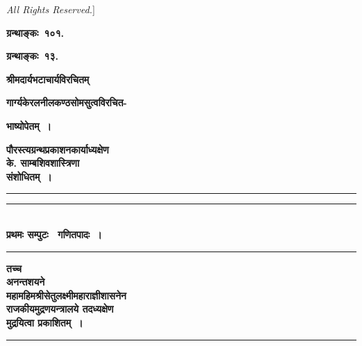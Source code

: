\documentclass[11pt, openany]{book}
\begin{document}
\emph{\en All Rights Reserved.}]\




\begin{center}
	
	\vspace{0.4cm}\large\textbf{ग्रन्थाङ्कः~१०१.}
	
	
	\vspace{0.2cm}\textbf{ग्रन्थाङ्कः~१३.}
	
	\vspace{0.2cm}
	
	{\Large\textbf{श्रीमदार्यभटाचार्यविरचितम् }}
	
	
	\vspace{0.2cm}\textbf{गार्ग्यकेरलनीलकण्ठसोमसुत्वविरचित- }
	
	\textbf{ भाष्योपेतम्~।}
	
	\vspace{0.2cm}
	
	\textbf{ पौरस्त्यग्रन्थप्रकाशनकार्याध्यक्षेण \\ के. साम्बशिवशास्त्रिणा\\ संशोधितम्~।}
	
	\rule{2cm}{0.3mm}
	
	\vspace{0.1cm}
	
	\begin{center}
		\rule{6cm}{0.3mm}\\
		\vspace{0.2cm}
		\textbf{ प्रथमः सम्पुटः \textendash\ गणितपादः~। }\\
		\rule{6cm}{0.3mm}
	\end{center}
	
	\vspace{0.1cm}
	
	\textbf{ तच्च \\ अनन्तशयने \\ महामहिमश्रीसेतुलक्ष्मीमहाराज्ञीशासनेन \\ राजकीयमुद्रणयन्त्रालये तदध्यक्षेण \\ मुद्रयित्वा प्रकाशितम्~।}
	
	\rule{2cm}{0.3mm}
	
	\thispagestyle{empty} 
\end{center}
\end{document}
